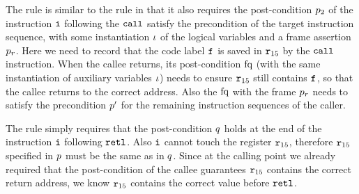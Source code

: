 The  rule is similar to the
  rule in that it also requires the
 post-condition $p_2$ of the instruction
 $\texttt{i}$ following the $\texttt{call}$ satisfy the precondition of the target instruction
sequence, with some instantiation $\iota$ of the
logical variables and a frame assertion $p_r$.
Here we need to record that the code label $\texttt{f}_{}$
is saved in $\texttt{r}_{15}$ by the $\texttt{call}$ instruction.
When the callee returns, its post-condition $\text{fq}$
(with
the same instantiation of auxiliary variables $\iota$)
needs to ensure $\texttt{r}_{15}$ still contains $\texttt{f}_{}$,
so that the callee returns to the correct address.
Also the $\text{fq}$ with the frame $p_r$ needs
to satisfy the precondition $p'$ for the
remaining instruction sequences of the caller.

The  rule simply requires that
the post-condition $q$ holds
at the end of the instruction
$\texttt{i}$ following $\texttt{retl}$.
Also $\texttt{i}$ cannot touch the register $\texttt{r}_{15}$,
therefore $\texttt{r}_{15}$ specified in $p$ must be the same
as in $q$.
Since at the calling point we already required that
the post-condition of the callee guarantees $\texttt{r}_{15}$
contains the correct return address,
we know $\texttt{r}_{15}$ contains the correct value
before $\texttt{retl}$.


